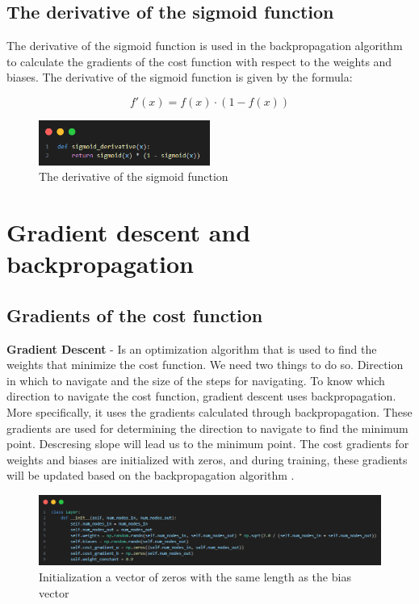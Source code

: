 \documentclass{article}
\begin{document}
\subsection{The derivative of the sigmoid function}
The derivative of the sigmoid function is used in the backpropagation algorithm to calculate the gradients of the cost function with respect to the weights and biases. The derivative of the sigmoid function is given by the formula:

\begin{equation}
    f'(x) = f(x) \cdot (1 - f(x))
\end{equation}

\begin{figure}[ht]
    \centering
    \includegraphics[width=0.5\textwidth]{images/sigmoid-derivative.png}
    \caption{The derivative of the sigmoid function}
    \label{fig:sigmoid_derivativse_function}
\end{figure}

\newpage
\section{Gradient descent and backpropagation}
\subsection{Gradients of the cost function}
\textbf{Gradient Descent} - Is an optimization algorithm that is used to find the weights that minimize the cost function. 
We need two things to do so. Direction in which to navigate and the size of the steps for navigating.
To know which direction to navigate the cost function, gradient descent uses backpropagation. More specifically, it uses the gradients calculated through backpropagation. These gradients are used for determining the direction to navigate to find the minimum point. Descresing slope will lead us to the minimum point.
The cost gradients for weights and biases are initialized with zeros, and during training, these gradients will be updated based on the backpropagation algorithm \cite{algorithms} .

\begin{figure}[ht]
    \centering 
    \includegraphics[width=1\textwidth]{images/Xavier-Glorot-initialization-for-weights.png}
    \caption{Initialization a vector of zeros with the same length as the bias vector}
    \label{fig:initialized_cost_gradient}
\end{figure}
\end{document}
